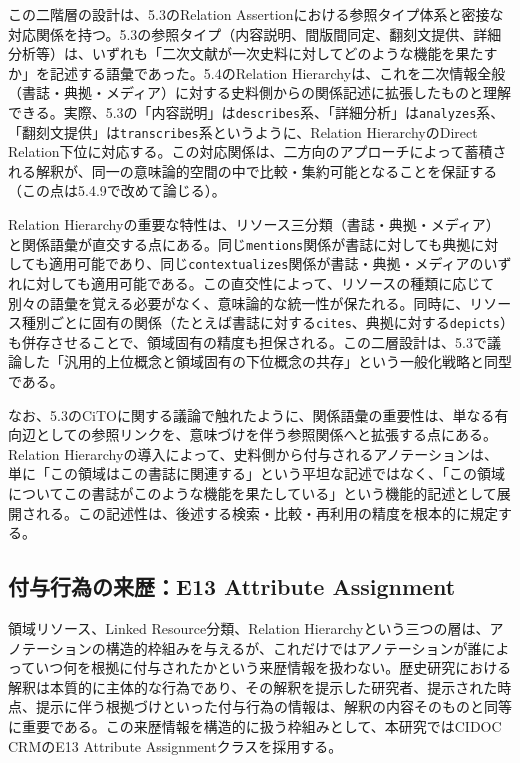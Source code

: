 この二階層の設計は、5.3のRelation Assertionにおける参照タイプ体系と密接な対応関係を持つ。5.3の参照タイプ（内容説明、間版間同定、翻刻文提供、詳細分析等）は、いずれも「二次文献が一次史料に対してどのような機能を果たすか」を記述する語彙であった。5.4のRelation Hierarchyは、これを二次情報全般（書誌・典拠・メディア）に対する史料側からの関係記述に拡張したものと理解できる。実際、5.3の「内容説明」は\texttt{describes}系、「詳細分析」は\texttt{analyzes}系、「翻刻文提供」は\texttt{transcribes}系というように、Relation HierarchyのDirect Relation下位に対応する。この対応関係は、二方向のアプローチによって蓄積される解釈が、同一の意味論的空間の中で比較・集約可能となることを保証する（この点は5.4.9で改めて論じる）。

Relation Hierarchyの重要な特性は、リソース三分類（書誌・典拠・メディア）と関係語彙が直交する点にある。同じ\texttt{mentions}関係が書誌に対しても典拠に対しても適用可能であり、同じ\texttt{contextualizes}関係が書誌・典拠・メディアのいずれに対しても適用可能である。この直交性によって、リソースの種類に応じて別々の語彙を覚える必要がなく、意味論的な統一性が保たれる。同時に、リソース種別ごとに固有の関係（たとえば書誌に対する\texttt{cites}、典拠に対する\texttt{depicts}）も併存させることで、領域固有の精度も担保される。この二層設計は、5.3で議論した「汎用的上位概念と領域固有の下位概念の共存」という一般化戦略と同型である。

なお、5.3のCiTOに関する議論で触れたように、関係語彙の重要性は、単なる有向辺としての参照リンクを、意味づけを伴う参照関係へと拡張する点にある。Relation Hierarchyの導入によって、史料側から付与されるアノテーションは、単に「この領域はこの書誌に関連する」という平坦な記述ではなく、「この領域についてこの書誌がこのような機能を果たしている」という機能的記述として展開される。この記述性は、後述する検索・比較・再利用の精度を根本的に規定する。

\subsection{付与行為の来歴：E13 Attribute Assignment}

領域リソース、Linked Resource分類、Relation Hierarchyという三つの層は、アノテーションの構造的枠組みを与えるが、これだけではアノテーションが誰によっていつ何を根拠に付与されたかという来歴情報を扱わない。歴史研究における解釈は本質的に主体的な行為であり、その解釈を提示した研究者、提示された時点、提示に伴う根拠づけといった付与行為の情報は、解釈の内容そのものと同等に重要である。この来歴情報を構造的に扱う枠組みとして、本研究ではCIDOC CRMのE13 Attribute Assignmentクラスを採用する。

